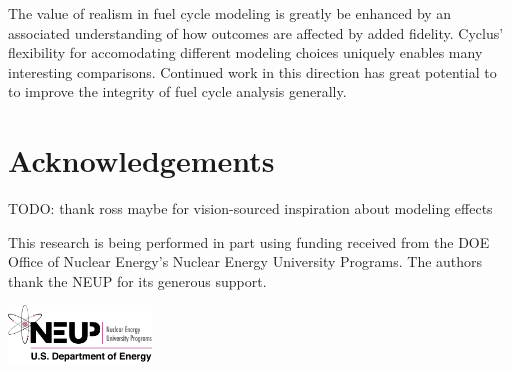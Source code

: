 \documentclass{style}
\begin{document}
The value of realism in fuel cycle modeling is greatly be enhanced by an
associated understanding of how outcomes are affected by added fidelity.
Cyclus' flexibility for accomodating different modeling choices uniquely
enables many interesting comparisons.  Continued work in this direction has
great potential to to improve the integrity of fuel cycle analysis generally.

\section{Acknowledgements}

TODO: thank ross maybe for vision-sourced inspiration about modeling effects

This research is being performed in part using funding received from the DOE
Office of Nuclear Energy's Nuclear Energy University Programs.  The authors
thank the NEUP for its generous support.

\begin{center}
\includegraphics[width=1.5in]{neup_logo_large.jpg}
\end{center}

\pagebreak



\end{document}
